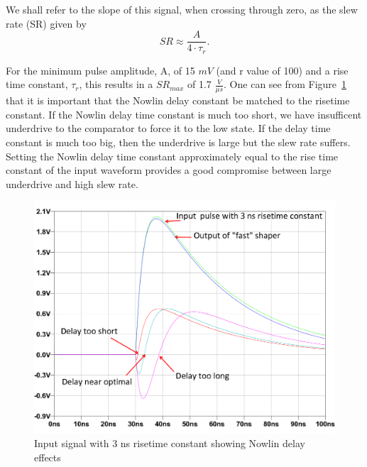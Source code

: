 \documentclass[12pt,oneside,final]{siuethesis}
\theoremstyle{definition}
\begin{document}
We shall refer to the slope of this signal, when crossing through zero, as the slew rate (SR) given by
\begin{equation}
SR \approx \frac{A}{4 \cdot \tau_r}.
\end{equation}

For the minimum pulse amplitude, A, of 15 $mV$ (and r value of 100) and a rise time constant, $\tau_r$, this results in a $SR_{max}$ of 1.7 $\frac{V}{\mu s}$. One can see from Figure~\ref{fig:nowlinout} that it is important that the Nowlin delay constant be matched to the risetime constant. If the Nowlin delay time constant is much too short, we have insufficent underdrive to the comparator to force it to the low state.  If the delay time constant is much too big, then the underdrive is large but the slew rate suffers. Setting the Nowlin delay time constant approximately equal to the rise time constant of the input waveform provides a good compromise between large underdrive and high slew rate.

\begin{figure}[htbp!]
\centering
\includegraphics[scale=.45,keepaspectratio=true]{./ch2_figures/nowlin.png} 
\caption{Input signal with 3 ns risetime constant showing Nowlin delay effects}
\label{fig:nowlinout}
\end{figure}
\end{document}
